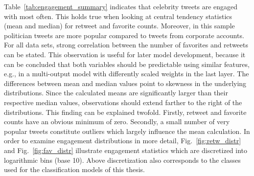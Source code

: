 Table~\ref{tab:engagement_summary} indicates that celebrity tweets are engaged
with most often.
This holds true when looking at central tendency statistics (mean and median)
for retweet and favorite counts.
Moreover, in this sample politician tweets are more popular compared to tweets from corporate
accounts.
For all data sets, strong correlation between the number of favorites and retweets can
be stated.
This observation is useful for later model development, because it can be concluded that
both variables should be predictable using similar features, e.g.,
in a multi-output model with differently scaled weights in the last layer.
The differences between mean and median values point to skewness in the
underlying distributions.
Since the calculated means are significantly larger than their respective
median values, observations should extend farther to the right
of the distributions.
This finding can be explained twofold. 
Firstly, retweet and favorite counts have an obvious  minimum of zero.
Secondly, a small number of very popular tweets constitute outliers which largely
influence the mean calculation.
In order to examine engagement distributions in more detail, Fig.~\ref{fig:retw_distr} and
Fig.~\ref{fig:fav_distr} illustrate engagement statistics which are discretized into logarithmic bins (base 10).
Above discretization also corresponds to the classes used for the classification models
of this thesis.

